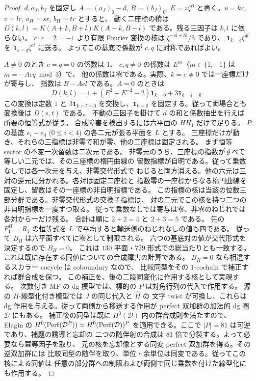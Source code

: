 \begin{proof}
$d,a_J,b_J$ を固定し $A=(a_J)_0-d$, $B=(b_J)_0$, $E=z\zeta^B$
と書く。$u=kr$, $v=lr$, $a_H=sr$, $b_H=tr$ とすると、
動く二座標の積は
$D(k,l)=K(A+k,B+l)K(A-k,B-l)$ である。残る三因子は $k,l$ に依らない。
$r\cdot r=2=-1$ より有限 Fourier 変換の核は
$\zeta^{-sl+tk}/3$ であり、
$\mathbf1_{k=c}\zeta^{ql}$ を $\mathbf1_{s=q}\zeta^{ct}$ に送る。
よってこの基底で係数が $c,q$ に対称であればよい。

$A\ne0$ のとき $c=q=0$ の係数は $1$、
$c,q\ne0$ の係数は $E^m$（$m\in\{1,-1\}$ は $m=-Acq\bmod3$）で、
他の係数は零である。実際、$k=c\ne0$ では一座標だけが寄与し、
指数は $B-Acl$ である。$A=0$ のときは
\[
 D(k,l)=1+(E^2+E^{-2}-2)\mathbf1_{k=0}
          +3\mathbf1_{k=l=0}.
\]
この変換は定数 $1$ と $3\mathbf1_{k=l=0}$ を交換し、$\mathbf1_{k=0}$
を固定する。従って両場合とも変換後は $D(s,t)$ である。
不動の三因子を掛けて $d$ の和と係数抽出を行えば所要の恒等式が従う。
合成障害を検出するには六平面の $HH_1$ だけで足りる。
$P$ の基底 $e_i-e_4$ ($0\le i<4$) の各二元が張る平面を $L$ とする。
三座標だけが動き、それらの三指標は非零で和が零、他の二座標は固定される。
まず恒等 sector の不変一次留数は二次元である。
非零元のうち、三座標の指数がすべて等しい二元では、その三座標の楕円曲線の
留数指標が自明である。従って乗数なしでは各一次元を与え、非零交代形式で
ねじると両方消える。他の六元は三対の逆元に分かれる。各対は固定二座標と
指数零の一座標からなる楕円曲線を固定し、留数はその一座標の非自明指標である。
この指標の核は当該の位数三部分群である。非零交代形式の交換子指標は、
対の二元でこの核を持つ二つの非自明指標を一度ずつ取る。
従って乗数なしでは寄与は零、非零のねじれでは各対から一だけ残る。
合計は順に $2+2=4$ と $2+3=5$ である。
先の $F_1^H=R_1$ の恒等式を $L$ で平均すると輸送側のねじれなしの値も四である。
従って $B_H$ は六平面すべてに零として制限される。
六つの基底対の値が交代形式を決定するので $B_H=0$。
これは $130$ 平面・$729$ 形式での総当たりとも一致する。
これは既に存在する同値についての合成障害の計算である。
$B_H=0$ なら相違するスカラー cocycle は coboundary なので、
比較同型をその $1$-cochain で補正すれば群合成を保つ。
この補正を、後の二段同変化に作用する核として実現する。
次数付き MF の dg 模型では、標的の $P$ は対角行列の代入で作用する。
源の $H$-線型化付き模型では $J$ の同じ代入と $\widehat H$ の
文字 twist が可換し、これらは dg 作用を与える。従って両側から移送する作用が
perfect 双加群の加法的 dg 圏 $\mathcal D$ にもある。
補正後の同型は既に $H^0(\mathcal D)$ 内の群合成則を満たすので、
Elagin \cite[Lemma~8.6]{MEDElagin}の
$H^0(\operatorname{Perf}(\mathcal D^P))\simeq H^0(\operatorname{Perf}(\mathcal D))^P$
を適用できる。ここで $|P|=81$ は可逆であり、補題の誘導と忘却の
二つの随伴射の合成は $81$ 倍で分裂する。よって必要なら冪等因子を取り、
元の核を忘却像とする同変 perfect 双加群を得る。その逆双加群には
比較同型の随伴を取り、単位・余単位は同変である。従ってこの核による同値は
任意の部分群への制限および両側で同じ乗数を付けた線型化にも作用する。
\end{proof}


